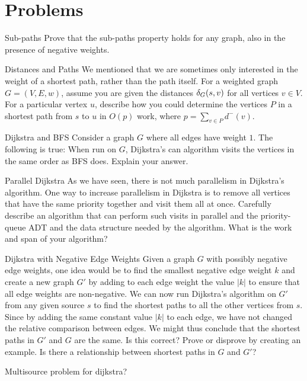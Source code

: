\section{Problems}

\begin{probl}{Sub-paths}
Prove that the sub-paths property holds for any graph, also in the
presence of negative weights.
\end{probl}

\begin{probl}{Distances and Paths}
We mentioned that we are sometimes only interested in the weight of a
shortest path, rather than the path itself.
%
For a weighted graph $G = (V,E,w)$, assume you are given the distances
$\delta_G(s,v)$ for all vertices $v \in V$.  For a particular vertex
$u$, describe how you could determine the vertices $P$ in a shortest
path from $s$ to $u$ in $O(p)$ work, where $p = \sum_{v \in P}
d^-(v)$.
\end{probl}

\begin{probl}{Dijkstra and BFS}
Consider a graph $G$ where all edges have weight $1$. The following is
true: When run on $G$, Dijkstra's can algorithm visits the vertices in
the same order as BFS does.
%
Explain your answer.
\end{probl}

\begin{probl}{Parallel Dijkstra}
As we have seen, there is not much parallelism in Dijkstra's
algorithm.
%
One way to increase parallelism in Dijkstra is to remove all vertices
that have the same priority together and visit them all at once.
%
Carefully describe an algorithm that can perform such visits in
parallel and the priority-queue ADT and the data structure needed by
the algorithm. 
%
What is the work and span of your algorithm? 
\end{probl}

\begin{probl}{Dijkstra with Negative Edge Weights}
Given a graph $G$ with possibly negative edge weights, one idea would
be to find the smallest negative edge weight $k$ and create a new
graph $G'$ by adding to each edge weight the value $|k|$ to ensure
that all edge weights are non-negative.  We can now run Dijkstra's
algorithm on $G'$ from any given source $s$ to find the shortest paths
to all the other vertices from $s$.  Since by adding the same constant
value $|k|$ to each edge, we have not changed the relative comparison
between edges.  We might thus conclude that the shortest paths in $G'$
and $G$ are the same.  Is this correct? Prove or disprove by creating
an example.  Is there a relationship between shortest paths in $G$ and $G'$?

\end{probl}

\begin{todo}
Multisource problem for dijkstra?
\end{todo}
\flushchapter
